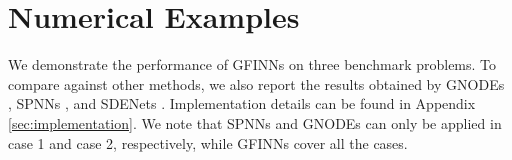 \documentclass[openacc]{rsproca_new}%
\begin{document}
\section{Numerical Examples} \label{sec:experiments}

We demonstrate the performance of GFINNs
on three benchmark problems.
To compare against other methods, 
we also report the results obtained by
GNODEs \cite{lee2021machine},
SPNNs \cite{hernandez2021structure},
and SDENets \cite{dietrich2021learning}.
Implementation details can be found in Appendix \ref{sec:implementation}.
We note that 
SPNNs
and GNODEs 
can only be applied in case 1
and case 2, respectively,
while GFINNs cover all the cases.
\end{document}
